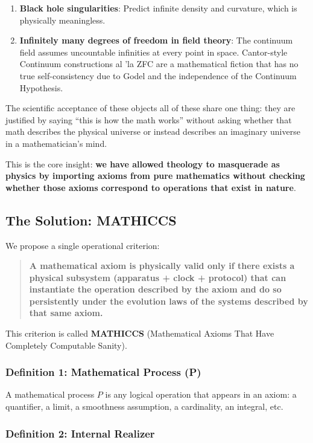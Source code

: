 \documentclass[11pt,a4paper]{article}
\begin{document}
\begin{enumerate}
\item \textbf{Black hole singularities}: Predict infinite density and curvature, which is physically meaningless.

\item \textbf{Infinitely many degrees of freedom in field theory}: The continuum field assumes uncountable infinities at every point in space. Cantor-style Continuum constructions al 'la ZFC are a mathematical fiction that has no true self-consistency due to Godel and the independence of the Continuum Hypothesis.

\end{enumerate}

The scientific acceptance of these objects all of these share one thing: they are justified by saying ``this is how the math works'' without asking whether that math describes the physical universe or instead describes an imaginary universe in a mathematician's mind.

This is the core insight: \textbf{we have allowed theology to masquerade as physics by importing axioms from pure mathematics without checking whether those axioms correspond to operations that exist in nature}.

\subsection{The Solution: MATHICCS}

We propose a single operational criterion:

\begin{quote}
\textbf{A mathematical axiom is physically valid only if there exists a physical subsystem (apparatus + clock + protocol) that can instantiate the operation described by the axiom and do so persistently under the evolution laws of the systems described by that same axiom.}
\end{quote}

This criterion is called \textbf{MATHICCS} (Mathematical Axioms That Have Completely Computable Sanity).

\subsubsection{Definition 1: Mathematical Process (P)}

A mathematical process $P$ is any logical operation that appears in an axiom: a quantifier, a limit, a smoothness assumption, a cardinality, an integral, etc.

\subsubsection{Definition 2: Internal Realizer}
\end{document}
